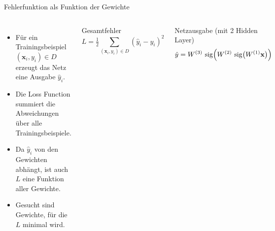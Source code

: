 \begin{frame}{Fehlerfunktion als Funktion der Gewichte}

\begin{columns}

\begin{itemize}
    \item Für ein Trainingsbeispiel $(\mathbf{x}_i,y_i)\in D$ erzeugt das Netz eine
          Ausgabe $\hat{y}_i$.

    \item Die Loss Function summiert die Abweichungen über alle
          Trainingsbeispiele.

    \item Da $\hat{y}_i$ von den Gewichten abhängt, ist auch $L$ eine Funktion
          aller Gewichte.

    \item Gesucht sind Gewichte, für die $L$ minimal wird.
\end{itemize}


\begin{block}{Gesamtfehler}
\[
    L =
    \tfrac12\sum_{(\mathbf{x}_i,y_i)\in D}
    \left(\hat{y}_i-y_i\right)^2
\]
\end{block}

\vspace{0.3cm}

\begin{blockC2}{Netzausgabe (mit 2 Hidden Layer)}
\[
  \hat{y}
  =
  W^{(3)}\,\operatorname{sig}\Bigl(
  W^{(2)}\,\operatorname{sig}
  \bigl(W^{(1)}\mathbf{x}\bigr)
  \Bigr)
\]
\end{blockC2}

\end{columns}
\end{frame}

